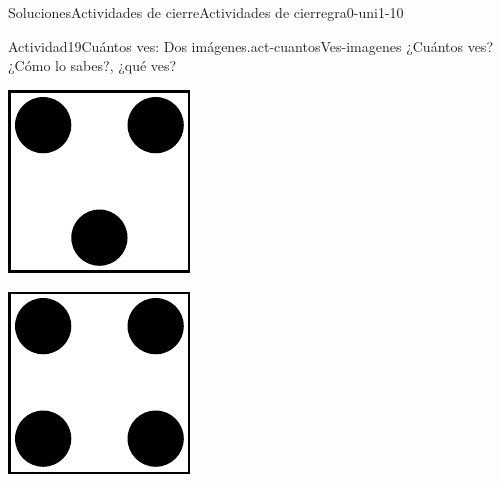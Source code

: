 \documentclass[twoside,10pt,]{article}
\begin{document}
\begin{solutions-section}{Soluciones}{Actividades de cierre}{}{Actividades de cierre}{}{}{gra0-uni1-10}
\begin{activitysolution}{Actividad}{19}{Cuántos ves: Dos imágenes.}{act-cuantosVes-imagenes}
¿Cuántos ves?\\
 ¿Cómo lo sabes?, ¿qué ves?%
\begin{sidebyside}{2}{0}{0}{0}%
\begin{sbspanel}{0.5}%
\includegraphics[width=\linewidth]{external/svg-source/tikz-file-148152.pdf}
\end{sbspanel}%
\begin{sbspanel}{0.5}%
\includegraphics[width=\linewidth]{external/svg-source/tikz-file-148153.pdf}

\end{sbspanel}
\end{sidebyside}
\end{activitysolution}
\end{solutions-section}
\end{document}

